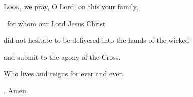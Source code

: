\lettrine[loversize=0.15,lines=2]{L}{ook,} we pray, O Lord, on this your family,\par
~for whom our Lord Jesus Christ\par
\noindent did not hesitate to be delivered into the hands of the wicked\par
\noindent and submit to the agony of the Cross.\par
\noindent Who lives and reigns for ever and ever. 
\par \noindent \Rbar. Amen.

